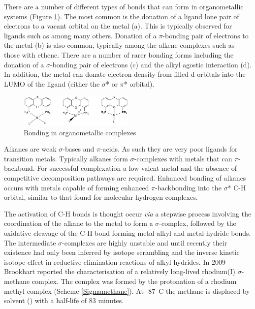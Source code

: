 There are a number of different types of bonds that can form in organometallic systems (Figure \ref{Bondingmodesintro}).  The most common is the donation of a ligand lone pair of electrons to a vacant orbital on the metal (a).  This is typically observed for ligands such as  among many others.  Donation of a $\pi$-bonding pair of electrons to the metal (b) is also common, typically among the alkene complexes such as those with ethene.  There are a number of rarer bonding forms including the donation of a $\sigma$-bonding pair of electrons (c) and the alkyl agostic interaction (d).\cite{Bernskoetter2009}  In addition, the metal can donate electron density from filled d orbitals into the LUMO of the ligand (either the $\sigma$* or $\pi$* orbital).\cite{Chatt1955}

\begin{figure}[ht]
\centering
\includegraphics[width = 0.5\textwidth]{../Figures/Bondingmodes.pdf}
\caption[Bonding in organometallic complexes]{Bonding in organometallic complexes}
\label{Bondingmodesintro}
\end{figure}

Alkanes are weak $\sigma$-bases and $\pi$-acids.  As such they are very poor ligands for transition metals.\cite{Crabtree1993}  Typically alkanes form $\sigma$-complexes with metals that can $\pi$-backbond.  For successful complexation a low valent metal and the absence of competitive decomposition pathways are required.\cite{Crabtree2001}  Enhanced bonding of alkanes occurs with metals capable of forming enhanced $\pi$-backbonding into the $\sigma$* C-H orbital, similar to that found for molecular hydrogen complexes.\cite{Kubas1988}

The activation of C-H bonds is thought occur \emph{via} a stepwise process involving the coordination of the alkane to the metal to form a $\sigma$-complex, followed by the oxidative cleavage of the C-H bond forming metal-alkyl and metal-hydride bonds.\cite{Labinger2002}  The intermediate  $\sigma$-complexes are highly unstable and until recently their existence had only been inferred by isotope scrambling and the inverse kinetic isotope effect in reductive elimination reactions of alkyl hydrides.\cite{Bernskoetter2009, Labinger2002}  In 2009 Brookhart reported the characterisation of a relatively long-lived rhodium(I) $\sigma$-methane complex.\cite{Bernskoetter2009}  The complex was formed by the protonation of a rhodium methyl complex (Scheme \ref{Sigmamethane}).  At -87~\degrees C the methane is displaced by solvent () with a half-life of 83 minutes.

